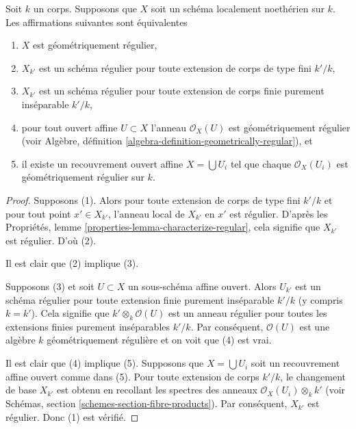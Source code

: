 \begin{lemma}
\label{lemma-geometrically-regular}
Soit $k$ un corps. Supposons que
$X$ soit un schéma localement noethérien sur
$k$. Les affirmations suivantes sont équivalentes
\begin{enumerate}
\item $X$ est géométriquement régulier, \item $X_{k'}$
est un schéma régulier pour toute extension de corps
de type fini $k'/k$, \item $X_{k'}$ est un schéma
régulier pour toute extension de corps finie purement
inséparable $k'/k$, \item pour tout ouvert affine $U
\subset X$ l'anneau $\mathcal{O}_X(U)$ est
géométriquement régulier (voir Algèbre, définition
\ref{algebra-definition-geometrically-regular}), et \item il
existe un recouvrement ouvert affine $X = \bigcup U_i$ tel que
chaque $\mathcal{O}_X(U_i)$ est géométriquement régulier sur $k$.
\end{enumerate}
\end{lemma}

\begin{proof}
Supposons (1). Alors pour toute extension de corps de
type fini $k'/k$ et pour tout point $x' \in X_{k'}$,
l'anneau local de $X_{k'}$ en $x'$ est régulier. D'après
les Propriétés, lemme
\ref{properties-lemma-characterize-regular}, cela signifie que $X_{k'}$ est régulier. D'où (2).

\medskip\noindent
Il est clair que (2) implique (3).

\medskip\noindent
Supposons (3) et soit $U \subset X$ un sous-schéma affine
ouvert. Alors $U_{k'}$ est un schéma régulier pour toute
extension finie purement inséparable $k'/k$ (y compris $k =
k'$). Cela signifie que $k' \otimes_k \mathcal{O}(U)$ est un
anneau régulier pour toutes les extensions finies purement
inséparables $k'/k$. Par conséquent, $\mathcal{O}(U)$ est une
algèbre $k$ géométriquement régulière et on voit que (4) est vrai.

\medskip\noindent
Il est clair que (4) implique (5). Supposons que $X = \bigcup
U_i$ soit un recouvrement affine ouvert comme dans (5). Pour toute
extension de corps $k'/k$, le changement de base $X_{k'}$ est
obtenu en recollant les spectres des anneaux $\mathcal{O}_X(U_i)
\otimes_k k'$ (voir Schémas, section
\ref{schemes-section-fibre-products}). Par conséquent, $X_{k'}$ est régulier. Donc (1) est vérifié.
\end{proof}

